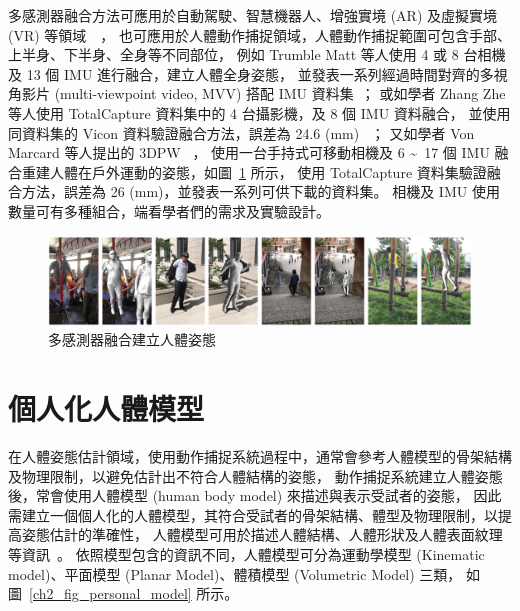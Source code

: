 多感測器融合方法可應用於自動駕駛、智慧機器人、增強實境 (AR) 及虛擬實境 (VR) 等領域~\cite{jinyu2019survey}~\cite{zhu2023camera}，
也可應用於人體動作捕捉領域，人體動作捕捉範圍可包含手部、上半身、下半身、全身等不同部位，
例如 Trumble Matt 等人使用 4 或 8 台相機及 13 個 IMU 進行融合，建立人體全身姿態，
並發表一系列經過時間對齊的多視角影片 (multi-viewpoint video, MVV) 搭配 IMU 資料集~\cite{Trumble:BMVC:2017}；
或如學者 Zhang Zhe 等人使用 TotalCapture 資料集中的 4 台攝影機，及 8 個 IMU 資料融合，
並使用同資料集的 Vicon 資料驗證融合方法，誤差為 24.6 (mm) ~\cite{zhang2020fusing}；
又如學者 Von Marcard 等人提出的 3DPW ~\cite{vonMarcard2018}，
使用一台手持式可移動相機及 6 \textasciitilde\ 17 個 IMU 融合重建人體在戶外運動的姿態，如圖~\ref{ch2_fig_3DPW} 所示，
使用 TotalCapture 資料集驗證融合方法，誤差為 26 (mm)，並發表一系列可供下載的資料集。
相機及 IMU 使用數量可有多種組合，端看學者們的需求及實驗設計。

\begin{figure}[!ht]
    \centering
    \includegraphics[width=\linewidth]{figure/ch2_fig_3DPW.png}
     \caption[多感測器融合建立人體姿態]{多感測器融合建立人體姿態}
     \label{ch2_fig_3DPW}
\end{figure}

\section{個人化人體模型}
在人體姿態估計領域，使用動作捕捉系統過程中，通常會參考人體模型的骨架結構及物理限制，以避免估計出不符合人體結構的姿態，
動作捕捉系統建立人體姿態後，常會使用人體模型 (human body model) 來描述與表示受試者的姿態，
因此需建立一個個人化的人體模型，其符合受試者的骨架結構、體型及物理限制，以提高姿態估計的準確性，
人體模型可用於描述人體結構、人體形狀及人體表面紋理等資訊~\cite{gong2016human}。
依照模型包含的資訊不同，人體模型可分為運動學模型 (Kinematic model)、平面模型 (Planar Model)、體積模型 (Volumetric Model) 三類，
如圖~\ref{ch2_fig_personal_model} 所示。

